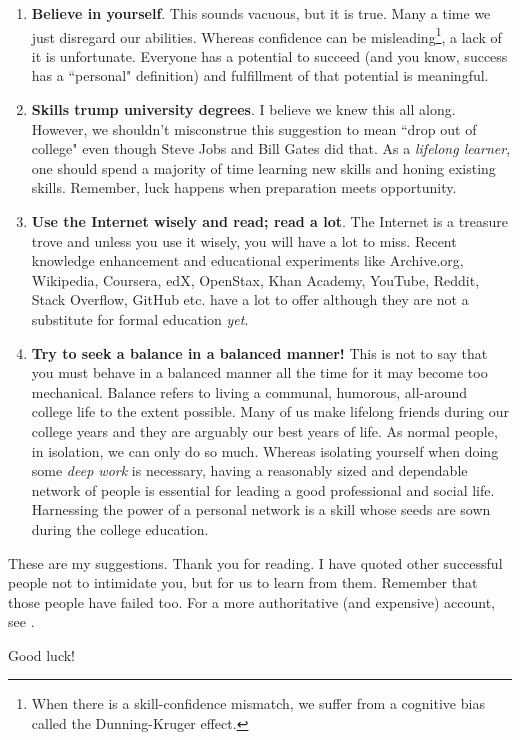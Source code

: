 \documentclass[a6paper]{article}
\begin{document}
\begin{enumerate}
    \item \textbf{Believe in yourself}. This sounds vacuous, but it is true. Many a time we just disregard our abilities. Whereas confidence can be misleading\footnote{When there is a skill-confidence mismatch, we suffer from a cognitive bias called the Dunning-Kruger effect\cite{dke}.}, a lack of it is unfortunate. Everyone has a potential to succeed (and you know, success has a ``personal" definition) and fulfillment of that potential is meaningful. 
    \item \textbf{Skills trump university degrees}. I believe we knew this all along. However, we shouldn't misconstrue this suggestion to mean ``drop out of college" even though Steve Jobs and Bill Gates did that. As a \emph{lifelong learner}, one should spend a majority of time learning new skills and honing existing skills. Remember, luck happens when preparation meets opportunity.
    \item \textbf{Use the Internet wisely and read; read a lot}. The Internet is a treasure trove and unless you use it wisely, you will have a lot to miss. Recent knowledge enhancement and educational experiments like Archive.org, Wikipedia, Coursera, edX, OpenStax, Khan Academy, YouTube, Reddit, Stack Overflow, GitHub etc. have a lot to offer although they are not a substitute for formal education \emph{yet}.
    \item \textbf{Try to seek a balance in a balanced manner!} This is not to say that you must behave in a balanced manner all the time for it may become too mechanical. Balance refers to living a communal, humorous, all-around college life to the extent possible. Many of us make lifelong friends during our college years and they are arguably our best years of life. As normal people, in isolation, we can only do so much. Whereas isolating yourself when doing some \emph{deep work} is necessary, having a reasonably sized and dependable network of people is essential for leading a good professional and social life. Harnessing the power of a personal network is a skill whose seeds are sown during the college education.
\end{enumerate}

These are my suggestions. Thank you for reading. I have quoted other successful people not to intimidate you, but for us to learn from them. Remember that those people have failed too. For a more authoritative (and expensive) account, see \cite{ken-bain}. 

\large{Good luck!}
\end{document}
